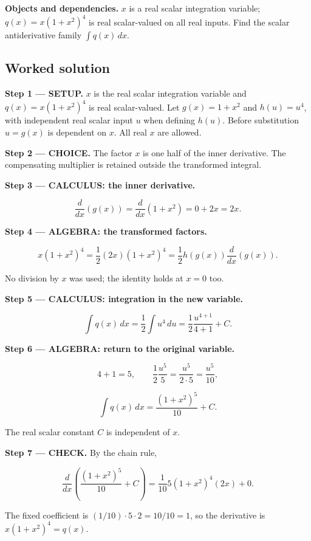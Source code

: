 \documentclass[11pt,oneside,openany]{book}
\begin{document}
\textbf{Objects and dependencies.} \(x\) is a real scalar integration variable;
\(q(x)=x(1+x^2)^4\) is real scalar-valued on all real inputs. Find the scalar
antiderivative family \(\int q(x)\,dx\).
\subsection*{Worked solution}

\textbf{Step 1 --- SETUP.} \(x\) is the real scalar integration variable and
\(q(x)=x(1+x^2)^4\) is real scalar-valued. Let \(g(x)=1+x^2\) and
\(h(u)=u^4\), with independent real scalar input \(u\) when defining \(h(u)\).
Before substitution \(u=g(x)\) is dependent on \(x\). All real \(x\) are allowed.

\begin{ChoiceStep}
\textbf{Step 2 --- CHOICE.} The factor \(x\) is one half of the inner derivative.
The compensating multiplier is retained outside the transformed integral.

\end{ChoiceStep}
\textbf{Step 3 --- CALCULUS: the inner derivative.}

\[
\frac{d}{dx}\left(g(x)\right)=\frac{d}{dx}\left(1+x^2\right)=0+2x=2x.
\]

\begingroup\color{AlgebraBlue}
\textbf{Step 4 --- ALGEBRA: the transformed factors.}

\[
x(1+x^2)^4=\frac12(2x)(1+x^2)^4
=\frac12h(g(x))\frac{d}{dx}\left(g(x)\right).
\]

No division by \(x\) was used; the identity holds at \(x=0\) too.

\endgroup
\textbf{Step 5 --- CALCULUS: integration in the new variable.}

\[
\int q(x)\,dx=\frac12\int u^4\,du
=\frac12\frac{u^{4+1}}{4+1}+C.
\]

\begingroup\color{AlgebraBlue}
\textbf{Step 6 --- ALGEBRA: return to the original variable.}

\[
4+1=5,\qquad \frac12\frac{u^5}{5}=\frac{u^5}{2\cdot5}=\frac{u^5}{10},
\]

\[
\int q(x)\,dx=\frac{(1+x^2)^5}{10}+C.
\]

The real scalar constant \(C\) is independent of \(x\).

\endgroup
\textbf{Step 7 --- CHECK.} By the chain rule,

\[
\frac{d}{dx}\left(\frac{(1+x^2)^5}{10}+C\right)
=\frac1{10}5(1+x^2)^4(2x)+0.
\]

The fixed coefficient is \((1/10)\cdot5\cdot2=10/10=1\), so the derivative
is \(x(1+x^2)^4=q(x)\).
\clearpage
\end{document}
